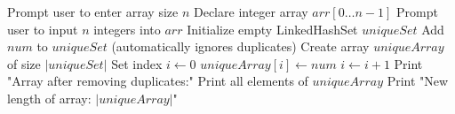 \begin{algorithm}[H]
\caption{Remove Duplicates from Array}
\begin{algorithmic}[1]
\STATE Prompt user to enter array size $n$
\STATE Declare integer array $arr[0 \ldots n-1]$
\STATE Prompt user to input $n$ integers into $arr$
\STATE Initialize empty LinkedHashSet $uniqueSet$
    \STATE Add $num$ to $uniqueSet$ (automatically ignores duplicates)
\ENDFOR
\STATE Create array $uniqueArray$ of size $|uniqueSet|$
\STATE Set index $i \gets 0$
    \STATE $uniqueArray[i] \gets num$
    \STATE $i \gets i + 1$
\ENDFOR
\STATE Print "Array after removing duplicates:"
\STATE Print all elements of $uniqueArray$
\STATE Print "New length of array: $|uniqueArray|$"
\end{algorithmic}
\end{algorithm}
